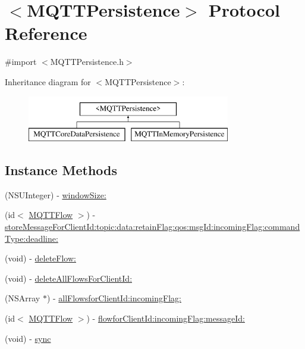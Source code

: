 \hypertarget{protocol_m_q_t_t_persistence-p}{}\section{$<$M\+Q\+T\+T\+Persistence$>$ Protocol Reference}
\label{protocol_m_q_t_t_persistence-p}


{\ttfamily \#import $<$M\+Q\+T\+T\+Persistence.\+h$>$}

Inheritance diagram for $<$M\+Q\+T\+T\+Persistence$>$\+:\begin{figure}[H]
\begin{center}
\leavevmode
\includegraphics[height=2.000000cm]{protocol_m_q_t_t_persistence-p}
\end{center}
\end{figure}
\subsection*{Instance Methods}
\begin{DoxyCompactItemize}
\item 
(N\+S\+U\+Integer) -\/ \hyperlink{protocol_m_q_t_t_persistence-p_a8521b079578db32e593d841ce2941fc0}{window\+Size\+:}
\item 
(id$<$ \hyperlink{interface_m_q_t_t_flow}{M\+Q\+T\+T\+Flow} $>$) -\/ \hyperlink{protocol_m_q_t_t_persistence-p_ac4dcb1941bac80050f643fab3faf0fe4}{store\+Message\+For\+Client\+Id\+:topic\+:data\+:retain\+Flag\+:qos\+:msg\+Id\+:incoming\+Flag\+:command\+Type\+:deadline\+:}
\item 
(void) -\/ \hyperlink{protocol_m_q_t_t_persistence-p_a415cc2c67ea2e73d7942973a2186d083}{delete\+Flow\+:}
\item 
(void) -\/ \hyperlink{protocol_m_q_t_t_persistence-p_a2c880d902ade2b17078545cef8d212e7}{delete\+All\+Flows\+For\+Client\+Id\+:}
\item 
(N\+S\+Array $\ast$) -\/ \hyperlink{protocol_m_q_t_t_persistence-p_a513e62e567e187ce73fab26f53d2272a}{all\+Flowsfor\+Client\+Id\+:incoming\+Flag\+:}
\item 
(id$<$ \hyperlink{interface_m_q_t_t_flow}{M\+Q\+T\+T\+Flow} $>$) -\/ \hyperlink{protocol_m_q_t_t_persistence-p_a2ca81852c486e32d888ef502b8dc47d5}{flowfor\+Client\+Id\+:incoming\+Flag\+:message\+Id\+:}
\item 
(void) -\/ \hyperlink{protocol_m_q_t_t_persistence-p_afd0744d75cb430bfa2c430e14c3a65e8}{sync}
\end{DoxyCompactItemize}
